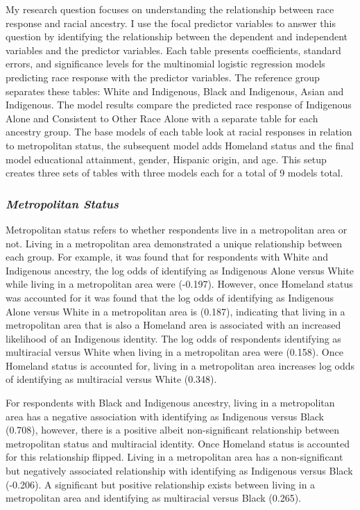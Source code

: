 \documentclass[
  12pt,
  letterpaper,
]{article}
\begin{document}
My research question focuses on understanding the relationship between
race response and racial ancestry. I use the focal predictor variables
to answer this question by identifying the relationship between the
dependent and independent variables and the predictor variables. Each
table presents coefficients, standard errors, and significance levels
for the multinomial logistic regression models predicting race response
with the predictor variables. The reference group separates these
tables: White and Indigenous, Black and Indigenous, Asian and
Indigenous. The model results compare the predicted race response of
Indigenous Alone and Consistent to Other Race Alone with a separate
table for each ancestry group. The base models of each table look at
racial responses in relation to metropolitan status, the subsequent
model adds Homeland status and the final model educational attainment,
gender, Hispanic origin, and age. This setup creates three sets of
tables with three models each for a total of 9 models total.

\subsubsection{\texorpdfstring{\emph{Metropolitan
Status}}{Metropolitan Status}}\label{metropolitan-status}

Metropolitan status refers to whether respondents live in a metropolitan
area or not. Living in a metropolitan area demonstrated a unique
relationship between each group. For example, it was found that for
respondents with White and Indigenous ancestry, the log odds of
identifying as Indigenous Alone versus White while living in a
metropolitan area were (-0.197). However, once Homeland status was
accounted for it was found that the log odds of identifying as
Indigenous Alone versus White in a metropolitan area is (0.187),
indicating that living in a metropolitan area that is also a Homeland
area is associated with an increased likelihood of an Indigenous
identity. The log odds of respondents identifying as multiracial versus
White when living in a metropolitan area were (0.158). Once Homeland
status is accounted for, living in a metropolitan area increases log
odds of identifying as multiracial versus White (0.348).

For respondents with Black and Indigenous ancestry, living in a
metropolitan area has a negative association with identifying as
Indigenous versus Black (0.708), however, there is a positive albeit
non-significant relationship between metropolitan status and multiracial
identity. Once Homeland status is accounted for this relationship
flipped. Living in a metropolitan area has a non-significant but
negatively associated relationship with identifying as Indigenous versus
Black (-0.206). A significant but positive relationship exists between
living in a metropolitan area and identifying as multiracial versus
Black (0.265).
\end{document}
